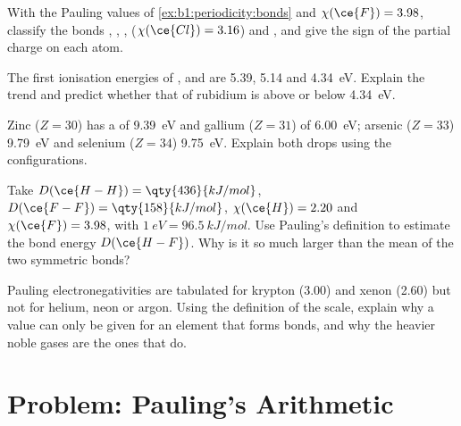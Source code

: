 \begin{exercise}[$\star\star$]\label{exo:b1:periodicity:8}
With the Pauling values of \cref{ex:b1:periodicity:bonds} and $\chi(\ce{F})
= 3.98$, classify the bonds , , , 
($\chi(\ce{Cl}) = 3.16$) and , and give the sign of the partial
charge on each atom.
\end{exercise}

\begin{exercise}[$\star\star$]\label{exo:b1:periodicity:9}
The first ionisation energies of ,  and  are 5.39,
5.14 and \qty{4.34}{eV}. Explain the trend and predict whether that of
rubidium is above or below \qty{4.34}{eV}.
\end{exercise}

\begin{exercise}[$\star\star\star$]\label{exo:b1:periodicity:10}
Zinc ($Z = 30$) has a  of \qty{9.39}{eV} and
gallium ($Z = 31$) of \qty{6.00}{eV}; arsenic ($Z = 33$) \qty{9.79}{eV}
and selenium ($Z = 34$) \qty{9.75}{eV}. Explain both drops using the
configurations.
\end{exercise}

\begin{exercise}[$\star\star\star$]\label{exo:b1:periodicity:11}
Take $D(\ce{H-H}) = \qty{436}{kJ/mol}$, $D(\ce{F-F}) =
\qty{158}{kJ/mol}$, $\chi(\ce{H}) = 2.20$ and $\chi(\ce{F}) = 3.98$, with
$\qty{1}{eV} = \qty{96.5}{kJ/mol}$. Use Pauling's definition to estimate
the bond energy $D(\ce{H-F})$. Why is it so much larger than the mean of
the two symmetric bonds?
\end{exercise}

\begin{exercise}[$\star\star\star$]\label{exo:b1:periodicity:12}
Pauling electronegativities are tabulated for krypton (3.00) and xenon
(2.60) but not for helium, neon or argon. Using the definition of the
scale, explain why a value can only be given for an element that forms
bonds, and why the heavier noble gases are the ones that do.
\end{exercise}

\section{Problem: Pauling's Arithmetic}

